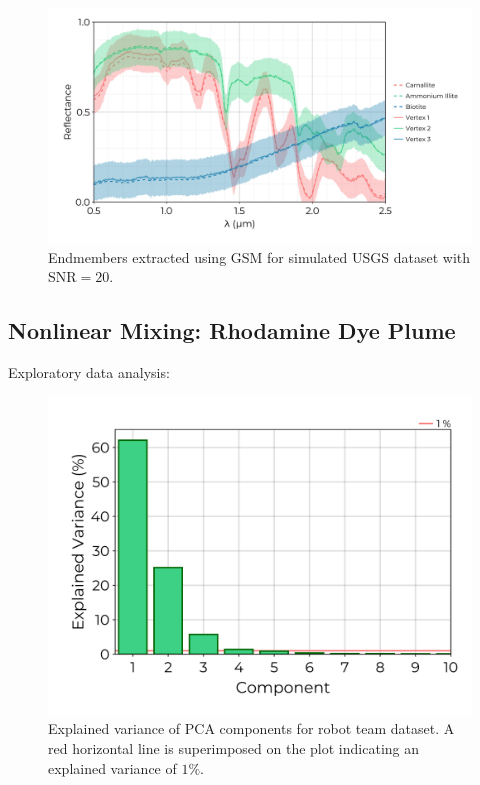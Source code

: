 \documentclass[remotesensing,article,submit,pdftex,moreauthors]{Definitions/mdpi}
\begin{document}
\begin{figure}[H]
\includegraphics[width=\columnwidth]{results/usgs/extracted-endmembers.png}
\caption{Endmembers extracted using GSM for simulated USGS dataset with SNR$=20$. \label{fig:usgs-endmembers}}
\end{figure}  


\subsection{Nonlinear Mixing: Rhodamine Dye Plume}

Exploratory data analysis: 
\begin{figure}[H]
\includegraphics[width=0.60\columnwidth]{results/robot-team/pca-variance.png}
\caption{Explained variance of PCA components for robot team dataset. A red horizontal line is superimposed on the plot indicating an explained variance of $1\%$. \label{fig:robot-team-pca}}
\end{figure}  
\end{document}
